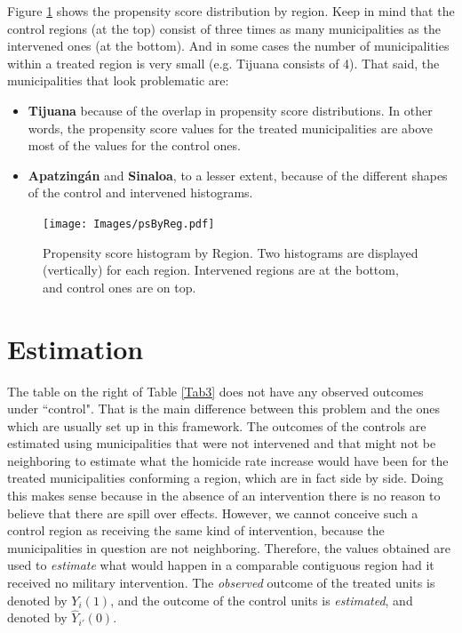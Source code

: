 \documentclass{article}[11 pt]
\begin{document}
Figure \ref{regionPS} shows the propensity score distribution by region. Keep in mind that the control regions (at the top) consist of three times as many municipalities as the intervened ones (at the bottom). And in some cases the number of municipalities within a treated region is very small (e.g. Tijuana consists of 4). That said, the municipalities that look problematic are:
\begin{itemize}
	\item \textbf{Tijuana} because of the overlap in propensity score distributions. In other words, the propensity score values for the treated municipalities are above most of the values for the control ones.
	\item \textbf{Apatzing\'{a}n} and \textbf{Sinaloa}, to a lesser extent, because of the different shapes of the control and intervened histograms. 	
\end{itemize}	
\begin{figure}[htdp]
	\centering		
	        \texttt{[image: Images/psByReg.pdf]}
	\caption{Propensity score histogram by Region. Two histograms are displayed (vertically) for each region. Intervened regions are at the bottom, and control ones are on top.}
	\label{regionPS}
\end{figure}	
			
\section{Estimation}

The table on the right of Table \ref{Tab3} does not have any observed outcomes under ``control". That is the main difference between this problem and the ones which are usually set up in this framework. The outcomes of the controls are estimated using municipalities that were not intervened and that might not be neighboring to estimate what the homicide rate increase would have been for the treated municipalities conforming a region, which are in fact side by side. Doing this makes sense because in the absence of an intervention there is no reason to believe that there are spill over effects. However, we cannot conceive such a control region as receiving the same kind of intervention, because the municipalities in question are not neighboring. Therefore, the values obtained are used to \emph{estimate} what would happen in a comparable contiguous region had it received no military intervention. The \emph{observed} outcome of the treated units is denoted by $Y_i(1)$, and the outcome of the control units is \emph{estimated}, and denoted by $\hat{Y}_{i'}(0)$. 	
\end{document}
